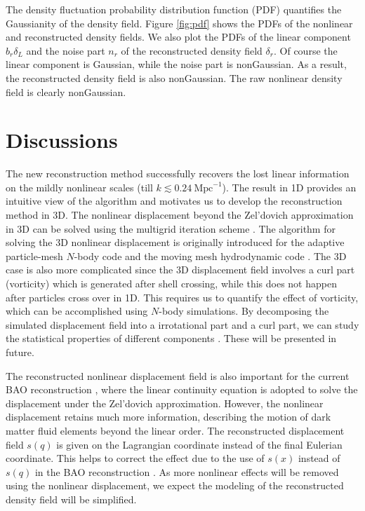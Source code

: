 \documentclass[aps,prd,twocolumn,showpacs,superscriptaddress,groupedaddress,nofootinbib]{revtex4}  %
\newcommand{\mr}{\mathrm}
\begin{document}
The density fluctuation probability distribution function (PDF) quantifies the 
Gaussianity of the density field. Figure \ref{fig:pdf} shows the PDFs of
the nonlinear and reconstructed density fields. We also plot the PDFs of the
linear component $b_r\delta_L$ and the noise part $n_r$ of the reconstructed 
density field $\delta_r$. Of course the linear component is Gaussian, while 
the noise part is nonGaussian. As a result, the reconstructed density field is 
also nonGaussian. The raw nonlinear density field is clearly nonGaussian.


\section{ Discussions}
\label{dis}
The new reconstruction method successfully recovers the lost linear information 
on the mildly nonlinear scales (till $k\lesssim0.24\ \mr{Mpc}^{-1}$).
The result in 1D provides an intuitive view of the algorithm and motivates us to
develop the reconstruction method in 3D. The nonlinear displacement beyond the
Zel'dovich approximation in 3D can be solved using the multigrid
iteration scheme \cite{1995ApJS..100..269P}. The algorithm 
for solving the 3D nonlinear displacement is originally introduced for the 
adaptive particle-mesh $N$-body code \cite{1995ApJS..100..269P} 
and the moving mesh hydrodynamic code \cite{1998ApJS..115...19P}.
The 3D case is also more complicated since the 3D displacement field involves
a curl part (vorticity) which is generated after shell crossing, 
while this does not happen after particles cross over in 1D. 
This requires us to quantify the effect of vorticity, which can be accomplished
using $N$-body simulations. 
By decomposing the simulated displacement field into a irrotational part and
a curl part, we can study the statistical properties of different components
\cite{2013PhRvD..87f3526Z,2013PhRvD..88j3510Z}.
These will be presented in future.

The reconstructed nonlinear displacement field is also important for the 
current BAO reconstruction \cite{2007bao}, where the linear continuity
equation is adopted to solve the displacement under the Zel'dovich 
approximation. 
However, the nonlinear displacement retains much more information, describing 
the motion of dark matter fluid elements beyond the linear order.
The reconstructed displacement field $s(q)$ is given on the Lagrangian 
coordinate instead of the final Eulerian coordinate. 
This helps to correct the effect due to the use of $s(x)$ instead of $s(q)$ 
in the BAO reconstruction \cite{2015MNRAS.450.3822W,2015PhRvD..92l3522S}.
As more nonlinear effects will be removed using the nonlinear displacement,
we expect the modeling of the reconstructed density field will be simplified.
\end{document}
